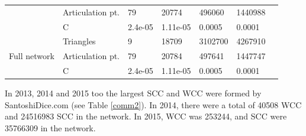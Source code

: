 \documentclass[preprint,12pt]{elsarticle}
\begin{document}
\begin{table}[H]
{\begin{tabular}{|l|l|l|l|l|l|l|}
                                 & Articulation pt.    &     79         &     20774          &    496060           &    1440988            \\
                                \cline{2-6} 
                          
                              & C            &     2.4e-05          &   1.11e-05            &   0.0005            &         0.0001            \\ \hline
\multirow{3}{*}{Full network} & Triangles    &     9          &     18709          &    3102700           &    4267910               \\ \cline{2-6} 
                       
                           & Articulation pt.    &     79         &    20784           &    497641           &  1447747                  \\
                                  \cline{2-6} 
                            
                              & C            &      2.4e-05         &    1.11e-05           &  0.0005             &      0.0001                      \\ \hline
\end{tabular}}
\end{table}

In 2013, 2014 and 2015 too the largest SCC and WCC were formed by SantoshiDice.com (see Table \ref{comm2}).  In 2014, there were a total of 40508 WCC and 24516983 SCC in the network. In 2015, WCC was 253244, and SCC were 35766309 in the network. 
\end{document}
